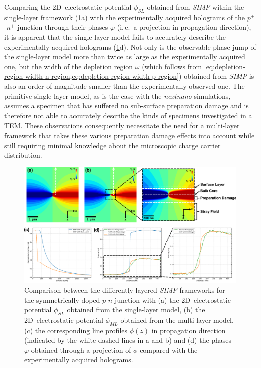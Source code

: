 Comparing the 2D~electrostatic potential $\phi_{\mathit{SL}}$ obtained from \emph{SIMP} within the single-layer framework (\cref{fig:pn-junction-SIMP-multilayer-EH-comparison}a) with the experimentally acquired holograms of the $p^+$-$n^+$-junction through their phases $\varphi$ (i.\,e.\ a projection in propagation direction), it is apparent that the single-layer model fails to accurately describe the experimentally acquired holograms (\cref{fig:pn-junction-SIMP-multilayer-EH-comparison}d). Not only is the observable phase jump of the single-layer model more than twice as large as the experimentally acquired one, but the width of the depletion region $\omega$ (which follows from \cref{eq:depletion-region-width-n-region,eq:depletion-region-width-p-region}) obtained from \emph{SIMP} is also an order of magnitude smaller than the experimentally observed one.
\newpage
The primitive single-layer model, as is the case with the \emph{nextnano} simulations, assumes a specimen that has suffered no sub-surface preparation damage and is therefore not able to accurately describe the kinds of specimens investigated in a TEM. These observations consequently necessitate the need for a multi-layer framework that takes these various preparation damage effects into account while still requiring minimal knowledge about the microscopic charge carrier distribution.
\begin{figure}[H]
	\centering
	\includegraphics[width=\textwidth]{Figures/Results/pn-Junction/Simulations/pn-junction-SIMP-multilayer-EH-comparison.pdf}
	\caption{Comparison between the differently layered \emph{SIMP} frameworks for the symmetrically doped $p$-$n$-junction with (a) the 2D~electrostatic potential $\phi_{\mathit{SL}}$ obtained from the single-layer model, (b) the 2D~electrostatic potential $\phi_{\mathit{ML}}$ obtained from the multi-layer model, (c) the corresponding line profiles $\phi\left(z\right)$ in propagation direction (indicated by the white dashed lines in a and b) and (d) the phases $\varphi$ obtained through a projection of $\phi$ compared with the experimentally acquired holograms.}
	\label{fig:pn-junction-SIMP-multilayer-EH-comparison}
\end{figure}
